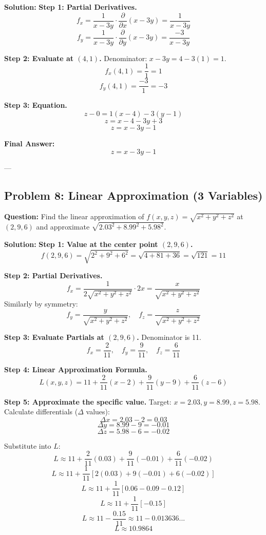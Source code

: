 \documentclass{article}
\begin{document}
\textbf{Solution:}
\textbf{Step 1: Partial Derivatives.}
\[ f_x = \frac{1}{x - 3y} \cdot \frac{\partial}{\partial x}(x - 3y) = \frac{1}{x - 3y} \]
\[ f_y = \frac{1}{x - 3y} \cdot \frac{\partial}{\partial y}(x - 3y) = \frac{-3}{x - 3y} \]

\textbf{Step 2: Evaluate at $(4, 1)$.}
Denominator: $x - 3y = 4 - 3(1) = 1$.
\[ f_x(4, 1) = \frac{1}{1} = 1 \]
\[ f_y(4, 1) = \frac{-3}{1} = -3 \]

\textbf{Step 3: Equation.}
\[ z - 0 = 1(x - 4) - 3(y - 1) \]
\[ z = x - 4 - 3y + 3 \]
\[ z = x - 3y - 1 \]

\textbf{Final Answer:} \[ z = x - 3y - 1 \]

---

\subsection*{Problem 8: Linear Approximation (3 Variables)}
\textbf{Question:} Find the linear approximation of $f(x, y, z) = \sqrt{x^2 + y^2 + z^2}$ at $(2, 9, 6)$ and approximate $\sqrt{2.03^2 + 8.99^2 + 5.98^2}$.

\textbf{Solution:}
\textbf{Step 1: Value at the center point $(2, 9, 6)$.}
\[ f(2, 9, 6) = \sqrt{2^2 + 9^2 + 6^2} = \sqrt{4 + 81 + 36} = \sqrt{121} = 11 \]

\textbf{Step 2: Partial Derivatives.}
\[ f_x = \frac{1}{2\sqrt{x^2+y^2+z^2}} \cdot 2x = \frac{x}{\sqrt{x^2+y^2+z^2}} \]
Similarly by symmetry:
\[ f_y = \frac{y}{\sqrt{x^2+y^2+z^2}}, \quad f_z = \frac{z}{\sqrt{x^2+y^2+z^2}} \]

\textbf{Step 3: Evaluate Partials at $(2, 9, 6)$.}
Denominator is 11.
\[ f_x = \frac{2}{11}, \quad f_y = \frac{9}{11}, \quad f_z = \frac{6}{11} \]

\textbf{Step 4: Linear Approximation Formula.}
\[ L(x, y, z) = 11 + \frac{2}{11}(x - 2) + \frac{9}{11}(y - 9) + \frac{6}{11}(z - 6) \]

\textbf{Step 5: Approximate the specific value.}
Target: $x = 2.03, y = 8.99, z = 5.98$.
Calculate differentials ($\Delta$ values):
\[ \Delta x = 2.03 - 2 = 0.03 \]
\[ \Delta y = 8.99 - 9 = -0.01 \]
\[ \Delta z = 5.98 - 6 = -0.02 \]

Substitute into $L$:
\[ L \approx 11 + \frac{2}{11}(0.03) + \frac{9}{11}(-0.01) + \frac{6}{11}(-0.02) \]
\[ L \approx 11 + \frac{1}{11} [ 2(0.03) + 9(-0.01) + 6(-0.02) ] \]
\[ L \approx 11 + \frac{1}{11} [ 0.06 - 0.09 - 0.12 ] \]
\[ L \approx 11 + \frac{1}{11} [ -0.15 ] \]
\[ L \approx 11 - \frac{0.15}{11} \approx 11 - 0.013636... \]
\[ L \approx 10.9864 \]
\end{document}
